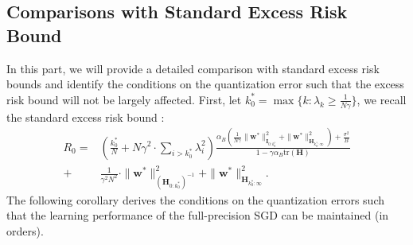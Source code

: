 \documentclass[11pt, letterpaper]{article}
\begin{document}
\subsection{Comparisons with Standard Excess Risk Bound}
\label{Comparisons}
In this part, we will provide a detailed comparison with standard excess risk bounds and identify the conditions on the quantization error such that the excess risk bound will not be largely affected. First, let $k_0^*=\max\{k: \lambda_k \geq \frac{1}{N\gamma}\}$, we recall the standard excess risk bound \citep{zou2023benign}: 
\begin{equation*}
    \begin{aligned}
        R_0=&\left(\frac{k_0^*}{N}+N\gamma^2\cdot\sum_{i>k_0^*}\lambda_i^2\right)\frac{\alpha_B\left(\frac{1}{N\gamma}\|{\mathbf{w}}^*\|_{\mathbf{I}_{0:k_0^*}}^2+\|{\mathbf{w}}^*\|_{\mathbf{H}_{k_0^*:\infty}}^2\right)
        +\frac{\sigma^2}{B}}{1-\gamma\alpha_B\mathrm{tr}\left(\mathbf{H}\right)}\\
        +&\frac{1}{\gamma^2N^2}\cdot\|{\mathbf{w}}^*\|_{(\mathbf{H}_{0:k_0^*})^{-1}}^2+\|{\mathbf{w}}^*\|_{\mathbf{H}_{k_0^*:\infty}}^2.
    \end{aligned}
\end{equation*}
The following corollary derives the conditions on the quantization errors such that the learning performance of the full-precision SGD can be maintained (in orders).
\end{document}

